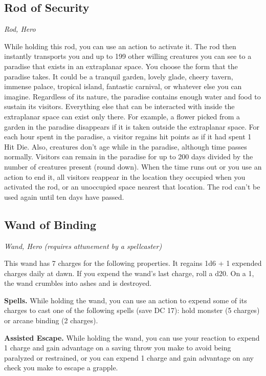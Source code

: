\subsection{Rod of Security}
\textit{Rod, Hero} 

While holding this rod, you can use an action to activate it. The rod then instantly transports you and up to 199 other willing creatures you can see to a paradise that exists in an extraplanar space. You choose the form that the paradise takes. It could be a tranquil garden, lovely glade, cheery tavern, immense palace, tropical island, fantastic carnival, or whatever else you can imagine. Regardless of its nature, the paradise contains enough water and food to sustain its visitors. Everything else that can be interacted with inside the extraplanar space can exist only there. For example, a flower picked from a garden in the paradise disappears if it is taken outside the extraplanar space.  For each hour spent in the paradise, a visitor regains hit points as if it had spent 1 Hit Die. Also, creatures don't age while in the paradise, although time passes normally. Visitors can remain in the paradise for up to 200 days divided by the number of creatures present (round down).  When the time runs out or you use an action to end it, all visitors reappear in the location they occupied when you activated the rod, or an unoccupied space nearest that location. The rod can't be used again until ten days have passed.

\subsection{Wand of Binding}
\textit{Wand, Hero (requires attunement by a spellcaster)} 

This wand has 7 charges for the following properties. It regains 1d6 + 1 expended charges daily at dawn. If you expend the wand's last charge, roll a d20. On a 1, the wand crumbles into ashes and is destroyed.

\textbf{Spells.} While holding the wand, you can use an action to expend some of its charges to cast one of the following spells (save DC 17): hold monster (5 charges) or arcane binding (2 charges).

\textbf{Assisted Escape.} While holding the wand, you can use your reaction to expend 1 charge and gain advantage on a saving throw you make to avoid being paralyzed or restrained, or you can expend 1 charge and gain advantage on any check you make to escape a grapple.


